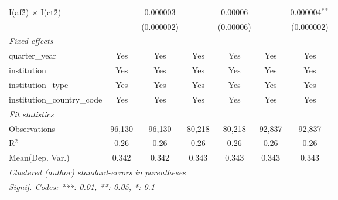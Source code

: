 \begin{tabular}{lcccccc}
   I(af\^2) $\times$ I(ct\^2)         &               & 0.000003        &               & 0.00006         &               & 0.000004$^{**}$\\   
                                      &               & (0.000002)      &               & (0.00006)       &               & (0.000002)\\   
   \midrule
   \emph{Fixed-effects}\\
   quarter\_year                      & Yes           & Yes             & Yes           & Yes             & Yes           & Yes\\  
   institution                        & Yes           & Yes             & Yes           & Yes             & Yes           & Yes\\  
   institution\_type                  & Yes           & Yes             & Yes           & Yes             & Yes           & Yes\\  
   institution\_country\_code         & Yes           & Yes             & Yes           & Yes             & Yes           & Yes\\  
   \midrule
   \emph{Fit statistics}\\
   Observations                       & 96,130        & 96,130          & 80,218        & 80,218          & 92,837        & 92,837\\  
   R$^2$                              & 0.26          & 0.26            & 0.26          & 0.26            & 0.26          & 0.26\\  
Mean(Dep. Var.) & 0.342 & 0.342 & 0.343 & 0.343 & 0.343 & 0.343 \\
   \midrule \midrule
   \multicolumn{7}{l}{\emph{Clustered (author) standard-errors in parentheses}}\\
   \multicolumn{7}{l}{\emph{Signif. Codes: ***: 0.01, **: 0.05, *: 0.1}}\\
\end{tabular}
\par\endgroup
